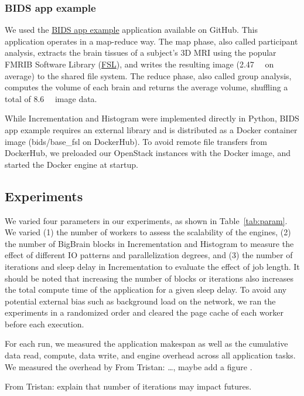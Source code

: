 \documentclass[conference]{IEEEtran}
\newcommand{\TG}[1]{\color{cyan}From Tristan: #1 \color{black}}
\begin{document}
\subsubsection{BIDS app example}

We used the \href{https://github.com/BIDS-Apps/example}{BIDS app example} application
available on GitHub. This application operates in a map-reduce way. The map phase,
also called participant analysis, extracts the brain tissues of a subject's 3D MRI
using the popular FMRIB Software Library
(\href{https://fsl.fmrib.ox.ac.uk/fsl/fslwiki}{FSL}), and writes the resulting image
(\SI{2.47}{\mega\byte} on average) to the shared file system. The reduce phase, also
called group analysis, computes the volume of each brain and returns the average
volume, shuffling a total of \SI{8.6}{\giga\byte} image data.

While Incrementation and Histogram were implemented directly in Python,
BIDS app example requires an external library and is distributed as a
Docker container image (bids/base\_fsl on DockerHub). To avoid remote file
transfers from DockerHub, we preloaded our OpenStack instances with the
Docker image, and started the Docker engine at startup.
\subsection{Experiments}

We varied four parameters in our experiments, as shown in
Table~\ref{tab:param}. We varied (1) the number of workers to assess the
scalability of the engines, (2) the number of BigBrain blocks in
Incrementation and Histogram to measure the effect of different IO patterns
and parallelization degrees, and (3) the number of iterations and sleep
delay in Incrementation to evaluate the effect of job length.
It should be noted that increasing the number of blocks or iterations also
increases the total compute time of the application for a given sleep
delay. To avoid any potential external bias such as background load on the
network, we ran the experiments in a randomized order and cleared the page
cache of each worker before each execution.

For each run, we measured the application makespan as well as the cumulative 
data read, compute, data write, and engine overhead across all application tasks. 
We measured the overhead by \TG{\ldots, maybe add a figure}.

\TG{explain that number of iterations may impact futures.}
\end{document}
